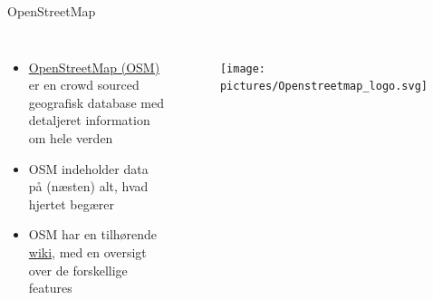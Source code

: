 \documentclass[
  8pt,
  ignorenonframetext,
  aspectratio=169]{beamer}
\newcommand{\columnsbegin}{\begin{columns}}
\newcommand{\columnsend}{\end{columns}}
\begin{document}
\begin{frame}{OpenStreetMap}
\protect\hypertarget{openstreetmap}{}
\columnsbegin


\begin{itemize}
\item
  \href{https://www.openstreetmap.org/about}{OpenStreetMap (OSM)} er en
  crowd sourced geografisk database med detaljeret information om hele
  verden
\item
  OSM indeholder data på (næsten) alt, hvad hjertet begærer
\item
  OSM har en tilhørende
  \href{https://wiki.openstreetmap.org/wiki/Map_features}{wiki}, med en
  oversigt over de forskellige features
\end{itemize}


\begin{figure}[H]
    \centering
    \texttt{[image: pictures/Openstreetmap\_logo.svg]}
\end{figure}

\columnsend
\end{frame}
\end{document}
